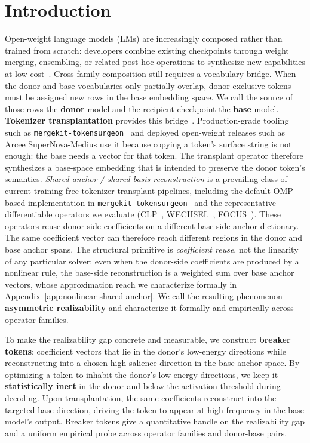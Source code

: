 \section{Introduction}
\label{sec:intro}


Open-weight language models (LMs) are increasingly composed rather than trained from scratch: developers combine existing checkpoints through weight merging, ensembling, or related post-hoc operations to synthesize new capabilities at low cost~\citep{wortsman2022soups,ilharco2022taskarithmetic, mergekit2024, yadav2023ties}.
Cross-family composition still requires a vocabulary bridge. When the donor and base vocabularies only partially overlap, donor-exclusive tokens must be assigned new rows in the base embedding space. We call the source of those rows the \textbf{donor} model and the recipient checkpoint the \textbf{base} model.
\textbf{Tokenizer transplantation} provides this bridge~\citep{goddard2025tftransplant,minixhofer2021wechsel,dobler2023focus,ostendorff2023efficient}. Production-grade tooling such as \texttt{mergekit-tokensurgeon}~\citep{mergekit2024} and deployed open-weight releases such as Arcee SuperNova-Medius use it because copying a token's surface string is not enough: the base needs a vector for that token. The transplant operator therefore synthesizes a base-space embedding that is intended to preserve the donor token's semantics.
\emph{Shared-anchor / shared-basis reconstruction} is a prevailing class of current training-free tokenizer transplant pipelines, including the default OMP-based implementation in \texttt{mergekit-tokensurgeon}~\citep{mergekit2024,goddard2025tftransplant} and the representative differentiable operators we evaluate (CLP~\citep{ostendorff2023efficient}, WECHSEL~\citep{minixhofer2021wechsel}, FOCUS~\citep{dobler2023focus}). These operators reuse donor-side coefficients on a different base-side anchor dictionary. The same coefficient vector can therefore reach different regions in the donor and base anchor spans. The structural primitive is \emph{coefficient reuse}, not the linearity of any particular solver: even when the donor-side coefficients are produced by a nonlinear rule, the base-side reconstruction is a weighted sum over base anchor vectors, whose approximation reach we characterize formally in Appendix~\ref{app:nonlinear-shared-anchor}. We call the resulting phenomenon \textbf{asymmetric realizability} and characterize it formally and empirically across operator families.

To make the realizability gap concrete and measurable, we construct \textbf{breaker tokens}: coefficient vectors that lie in the donor's low-energy directions while reconstructing into a chosen high-salience direction in the base anchor space. By optimizing a token to inhabit the donor's low-energy directions, we keep it \textbf{statistically inert} in the donor and below the activation threshold during decoding. Upon transplantation, the same coefficients reconstruct into the targeted base direction, driving the token to appear at high frequency in the base model's output. Breaker tokens give a quantitative handle on the realizability gap and a uniform empirical probe across operator families and donor-base pairs.

